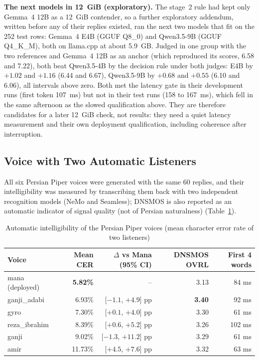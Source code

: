 \textbf{The next models in 12~GiB (exploratory).} The stage~2 rule had kept only Gemma~4 12B
as a 12~GiB contender, so a further exploratory addendum, written before any of their replies existed, ran the
next two models that fit on the 252 test rows: Gemma~4 E4B (GGUF Q8\_0) and Qwen3.5-9B (GGUF
Q4\_K\_M), both on llama.cpp at about 5.9~GB. Judged in one group with the two references and
Gemma~4 12B as an anchor (which reproduced its scores, 6.58 and 7.22), both beat Qwen3.5-4B by the
decision rule under both judges: E4B by $+1.02$ and $+1.16$ (6.44 and 6.67), Qwen3.5-9B by
$+0.68$ and $+0.55$ (6.10 and 6.06), all intervals above zero. Both met the latency gate in their
development runs (first token 107~ms) but not in their test runs (158 to 167~ms), which fell in
the same afternoon as the slowed qualification above. They are therefore candidates for a later
12~GiB check, not results: they need a quiet latency measurement and their own deployment
qualification, including coherence after interruption.

\subsection{Voice with Two Automatic Listeners}

All six Persian Piper voices were generated with the same 60 replies, and their
intelligibility was measured by transcribing them back with two independent recognition
models (NeMo and Seamless); DNSMOS is also reported as an automatic indicator of signal
quality (not of Persian naturalness) (Table~\ref{tab:tts-v2}).

\begin{table}[ht]
\centering
\caption{Automatic intelligibility of the Persian Piper voices (mean character error rate
         of two listeners)}
\label{tab:tts-v2}
\small
\begin{tabular}{lrrrr}
\toprule
Voice & Mean CER & $\Delta$ vs Mana (95\% CI) & DNSMOS OVRL & First 4 words \\
\midrule
mana (deployed) & \textbf{5.82\%} & -- & 3.13 & 84 ms \\
ganji\_adabi & 6.93\% & [$-1.1$, $+4.9$] pp & \textbf{3.40} & 92 ms \\
gyro & 7.30\% & [$+0.1$, $+4.0$] pp & 3.30 & 61 ms \\
reza\_ibrahim & 8.39\% & [$+0.6$, $+5.2$] pp & 3.26 & 102 ms \\
ganji & 9.02\% & [$-1.3$, $+11.2$] pp & 3.29 & 61 ms \\
amir & 11.73\% & [$+4.5$, $+7.6$] pp & 3.32 & 63 ms \\
\bottomrule
\end{tabular}
\end{table}

